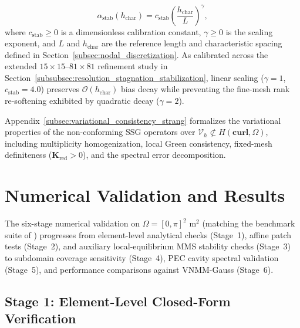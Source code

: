 \documentclass[VANCOUVER]{USG}
\begin{document}
\begin{equation}
    \alpha_{\mathrm{stab}}(h_{\mathrm{char}}) = c_{\mathrm{stab}} \left(\frac{h_{\mathrm{char}}}{L}\right)^{\gamma},
    \label{eq:alpha_stab_vms_scaling}
\end{equation}
where $c_{\mathrm{stab}} \ge 0$ is a dimensionless calibration constant, $\gamma \ge 0$ is the scaling exponent, and $L$ and $h_{\mathrm{char}}$ are the reference length and characteristic spacing defined in Section~\ref{subsec:nodal_discretization}. As calibrated across the extended $15\times 15\text{--}81\times 81$ refinement study in Section~\ref{subsubsec:resolution_stagnation_stabilization}, linear scaling ($\gamma = 1$, $c_{\mathrm{stab}} = 4.0$) preserves $\mathcal{O}(h_{\mathrm{char}})$ bias decay while preventing the fine-mesh rank re-softening exhibited by quadratic decay ($\gamma = 2$).

\begin{remark}
\label{rem:variational_summary}
    Appendix~\ref{subsec:variational_consistency_strang} formalizes the variational properties of the non-conforming SSG operators over $\mathcal{V}_h \not\subset H(\mathbf{curl}, \Omega)$, including multiplicity homogenization, local Green consistency, fixed-mesh definiteness ($\mathbf{K}_{\mathrm{red}} > 0$), and the spectral error decomposition.
\end{remark}

\section{Numerical Validation and Results}
\label{sec:results}

The six-stage numerical validation on $\Omega = [0, \pi]^2\text{ m}^2$ (matching the benchmark suite of \cite{stable_vnmm2d_2026}) progresses from element-level analytical checks (Stage~1), affine patch tests (Stage~2), and auxiliary local-equilibrium MMS stability checks (Stage~3) to subdomain coverage sensitivity (Stage~4), PEC cavity spectral validation (Stage~5), and performance comparisons against VNMM-Gauss (Stage~6).

\subsection{Stage 1: Element-Level Closed-Form Verification}
\label{subsec:stage1_results}
\end{document}
